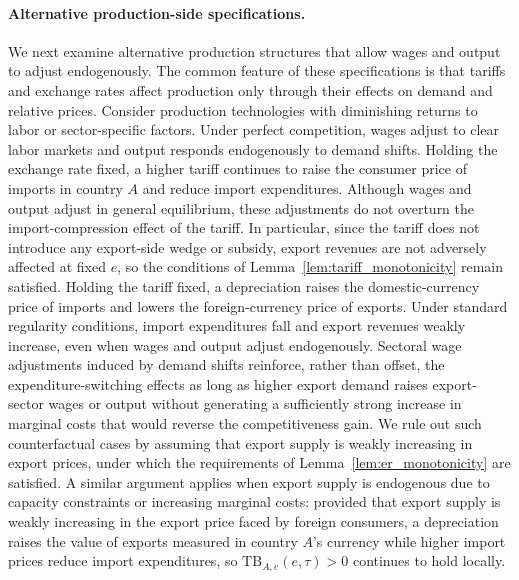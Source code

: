 \documentclass[11pt]{article}
\theoremstyle{plain}
\theoremstyle{remark}
\numberwithin{lemma}{section}
\numberwithin{proposition}{section}
\numberwithin{corollary}{section}
\begin{document}
\begin{appendix}
\paragraph{Alternative production-side specifications.}
We next examine alternative production structures that allow wages and output to adjust endogenously. The common feature of these specifications is that tariffs and exchange rates affect production only through their effects on demand and relative prices. Consider production technologies with diminishing returns to labor or sector-specific factors. Under perfect competition, wages adjust to clear labor markets and output responds endogenously to demand shifts. Holding the exchange rate fixed, a higher tariff continues to raise the consumer price of imports in country $A$ and reduce import expenditures. Although wages and output adjust in general equilibrium, these adjustments do not overturn the import-compression effect of the tariff. In particular, since the tariff does not introduce any export-side wedge or subsidy, export revenues are not adversely affected at fixed $e$, so the conditions of Lemma~\ref{lem:tariff_monotonicity} remain satisfied. Holding the tariff fixed, a depreciation raises the domestic-currency price of imports and lowers the foreign-currency price of exports. Under standard regularity conditions, import expenditures fall and export revenues weakly increase, even when wages and output adjust endogenously. Sectoral wage adjustments induced by demand shifts reinforce, rather than offset, the expenditure-switching effects as long as higher export demand raises export-sector wages or output without generating a sufficiently strong increase in marginal costs that would reverse the competitiveness gain. We rule out such counterfactual cases by assuming that export supply is weakly increasing in export prices, under which the requirements of Lemma~\ref{lem:er_monotonicity} are satisfied. A similar argument applies when export supply is endogenous due to capacity constraints or increasing marginal costs: provided that export supply is weakly increasing in the export price faced by foreign consumers, a depreciation raises the value of exports measured in country $A$'s currency while higher import prices reduce import expenditures, so $\mathrm{TB}_{A,e}(e,\tau) > 0$ continues to hold locally.


\end{appendix}
\end{document}
